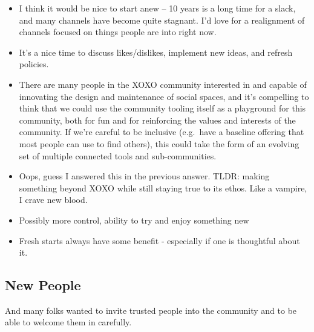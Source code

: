 \documentclass[
]{book}
\providecommand{\tightlist}{%
  \setlength{\itemsep}{0pt}\setlength{\parskip}{0pt}}
\begin{document}
\begin{itemize}
\tightlist
\item
  I think it would be nice to start anew -- 10 years is a long time for a slack, and many channels have become quite stagnant. I'd love for a realignment of channels focused on things people are into right now.
\item
  It's a nice time to discuss likes/dislikes, implement new ideas, and refresh policies.
\item
  There are many people in the XOXO community interested in and capable of innovating the design and maintenance of social spaces, and it's compelling to think that we could use the community tooling itself as a playground for this community, both for fun and for reinforcing the values and interests of the community. If we're careful to be inclusive (e.g.~have a baseline offering that most people can use to find others), this could take the form of an evolving set of multiple connected tools and sub-communities.
\item
  Oops, guess I answered this in the previous answer. TLDR: making something beyond XOXO while still staying true to its ethos. Like a vampire, I crave new blood.
\item
  Possibly more control, ability to try and enjoy something new
\item
  Fresh starts always have some benefit - especially if one is thoughtful about it.
\end{itemize}

\subsection{New People}\label{new-people}

And many folks wanted to invite trusted people into the community and to be able to welcome them in carefully.
\end{document}
